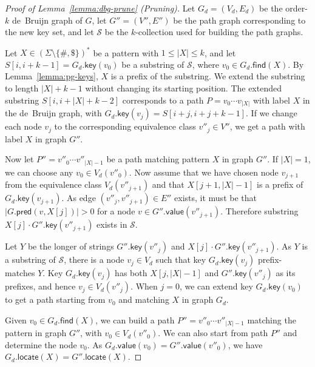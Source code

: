 \documentclass[a4paper,11pt]{llncs}
\newcommand{\set}[1]{\ensuremath{\{ #1 \}}}
\newcommand{\abs}[1]{\ensuremath{\lvert #1 \rvert}}
\newcommand{\find}{\ensuremath{\mathsf{find}}}
\newcommand{\locate}{\ensuremath{\mathsf{locate}}}
\newcommand{\gpred}{\ensuremath{\mathsf{pred}}}
\newcommand{\gkey}{\ensuremath{\mathsf{key}}}
\newcommand{\gvalue}{\ensuremath{\mathsf{value}}}
\newcommand{\kcollection}[1]{$#1$\nobreakdash-collection}
\newcommand{\orderk}[1]{order\nobreakdash-$#1$}
\newcommand{\patternset}{\ensuremath{(\Sigma \setminus \set{\#, \$})^{\ast}}}
\begin{document}
\begin{proof}[Proof of Lemma~\ref{lemma:dbg-prune} (Pruning)]
Let $G_{d} = (V_{d}, E_{d})$ be the \orderk{k} de~Bruijn graph of $G$, let $G'' = (V'', E'')$ be the path graph corresponding to the new key set, and let $\mathcal{S}$ be the \kcollection{k} used for building the path graphs.

Let $X \in \patternset$ be a pattern with $1 \le \abs{X} \le k$, and let $S[i, i+k-1] = G_{d}.\gkey(v_{0})$ be a substring of $\mathcal{S}$, where $v_{0} \in G_{d}.\find(X)$. By Lemma~\ref{lemma:pg-keys}, $X$ is a prefix of the substring. We extend the substring to length $\abs{X}+k-1$ without changing its starting position. The extended substring $S[i, i+\abs{X}+k-2]$ corresponds to a path $P = v_{0} \dotsm v_{\abs{X}}$ with label $X$ in the de~Bruijn graph, with $G_{d}.\gkey(v_{j}) = S[i+j, i+j+k-1]$. If we change each node $v_{j}$ to the corresponding equivalence class $v''_{j} \in V''$, we get a path with label $X$ in graph $G''$.

Now let $P'' = v''_{0} \dotsm v''_{\abs{X}-1}$ be a path matching pattern $X$ in graph $G''$. If $\abs{X} = 1$, we can choose any $v_{0} \in V_{d}(v''_{0})$. Now assume that we have chosen node $v_{j+1}$ from the equivalence class $V_{d}(v''_{j+1})$ and that $X[j+1, \abs{X}-1]$ is a prefix of $G_{d}.\gkey(v_{j+1})$. As edge $(v''_{j}, v''_{j+1}) \in E''$ exists, it must be that $\abs{G.\gpred(v, X[j])} > 0$ for a node $v \in G''.\gvalue(v''_{j+1})$. Therefore substring $X[j] \cdot G''.\gkey(v''_{j+1})$ exists in $\mathcal{S}$.

Let $Y$ be the longer of strings $G''.\gkey(v''_{j})$ and $X[j] \cdot G''.\gkey(v''_{j+1})$. As $Y$ is a substring of $\mathcal{S}$, there is a node $v_{j} \in V_{d}$ such that key $G_{d}.\gkey(v_{j})$ prefix-matches $Y$. Key $G_{d}.\gkey(v_{j})$ has both $X[j, \abs{X}-1]$ and $G''.\gkey(v''_{j})$ as its prefixes, and hence $v_{j} \in V_{d}(v''_{j})$. When $j = 0$, we can extend key $G_{d}.\gkey(v_{0})$ to get a path starting from $v_{0}$ and matching $X$ in graph $G_{d}$.

Given $v_{0} \in G_{d}.\find(X)$, we can build a path $P'' = v''_{0} \dotsm v''_{\abs{X}-1}$ matching the pattern in graph $G''$, with $v_{0} \in V_{d}(v''_{0})$. We can also start from path $P''$ and determine the node $v_{0}$. As $G_{d}.\gvalue(v_{0}) = G''.\gvalue(v''_{0})$, we have $G_{d}.\locate(X) = G''.\locate(X)$.
\end{proof}
\end{document}
